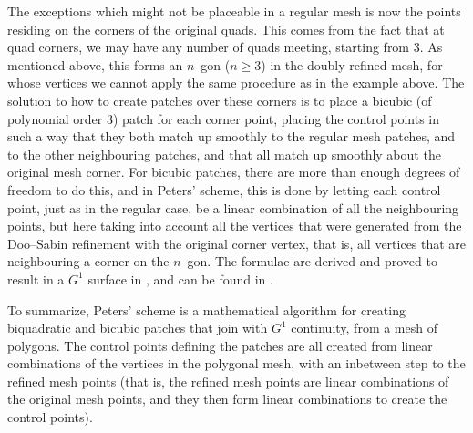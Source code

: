 
The exceptions which might not be placeable in a regular mesh is now the points residing on the corners of the original quads. This comes from the fact that at quad corners, we may have any number of quads meeting, starting from 3.  As mentioned above, this forms an $n$--gon ($n \geq 3$) in the doubly refined mesh, for whose vertices we cannot apply the same procedure as in the example above. 
The solution to how to create \Bez patches over these corners is to place a bicubic (of polynomial order 3) \Bez patch for each corner point, placing the \Bez control points in such a way that they both match up smoothly to the regular mesh patches, and to the other neighbouring patches, and that all match up smoothly about the original mesh corner. For bicubic \Bez patches, there are more than enough degrees of freedom to do this, and in Peters' scheme, this is done by letting each \Bez control point, just as in the regular case, be a linear combination of all the neighbouring points, but here taking into account all the vertices that were generated from the Doo--Sabin refinement with the original corner vertex, that is, all vertices that are neighbouring a corner on the $n$--gon. The formulae are derived and proved to result in a $G^1$ surface in \cite{peters1992constructing}, and can be found in . 

To summarize, Peters' scheme is a mathematical algorithm for creating biquadratic and bicubic \Bez patches that join with $G^1$ continuity, from a mesh of polygons. The \Bez control points defining the patches are all created from linear combinations of the vertices in the polygonal mesh, with an inbetween step to the refined mesh points (that is, the refined mesh points are linear combinations of the original mesh points, and they then form linear combinations to create the \Bez control points).


